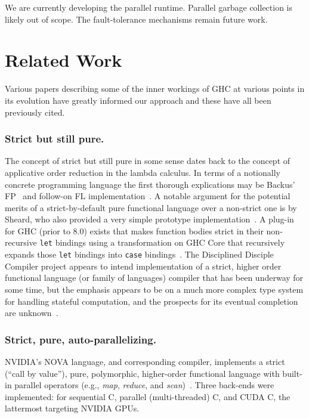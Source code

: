 \documentclass{llncs}
\begin{document}
We are currently developing the parallel runtime.  Parallel garbage collection
is likely out of scope.
%
The fault-tolerance mechanisms remain future work.





\section{Related Work}

Various papers describing some of the inner workings of GHC at various points
in its evolution have greatly informed our approach and these have all been
previously cited.

\subsubsection{Strict but still pure.}
The concept of strict but still pure in some sense dates back to the concept
of applicative order reduction in the lambda calculus.  In terms of a
notionally concrete programming language the first thorough explications may
be Backus' FP~\cite{Backus:1978} and follow-on FL
implementation~\cite{AikenFL,FLreport89}.
%
A notable argument for the potential merits of a strict-by-default
pure functional language over a non-strict one is by Sheard, who also provided
a very simple prototype implementation~\cite{Sheard:2003}.
%
A plug-in for GHC (prior to 8.0) exists that makes function bodies strict in
their non-recursive \texttt{let} bindings using a transformation on GHC Core
that recursively expands those \texttt{let} bindings into \texttt{case}
bindings~\cite{Bolingbroke:2008,strict-ghc-plugin}.
%
The Disciplined Disciple Compiler project appears to intend implementation of
a strict, higher order functional language (or family of languages) compiler
that has been underway for some time, but the emphasis appears to be on a much
more complex type system for handling stateful computation, and the prospects
for its eventual completion are unknown~\cite{disciplined-disciple}.

\subsubsection{Strict, pure, auto-parallelizing.}
NVIDIA's NOVA language, and corresponding compiler, implements a strict
(``call by value''), pure, polymorphic, higher-order functional language with
built-in parallel operators (e.g., \emph{map}, \emph{reduce}, and
\emph{scan})~\cite{NVIDIA:2013}. Three back-ends were implemented: for
sequential C, parallel (multi-threaded) C, and CUDA C, the lattermost
targeting NVIDIA GPUs.
\end{document}
